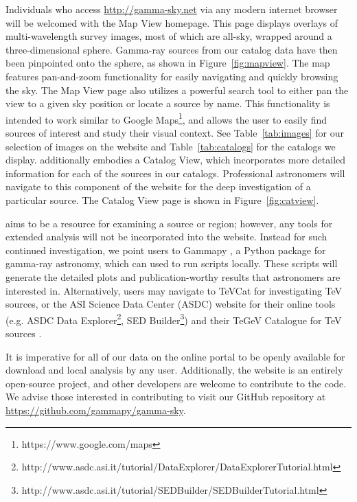 Individuals who access \url{http://gamma-sky.net} via any modern internet browser will be welcomed with the Map View homepage. This page displays overlays of multi-wavelength survey images, most of which are all-sky, wrapped around a three-dimensional sphere. Gamma-ray sources from our catalog data have then been pinpointed onto the sphere, as shown in Figure~\ref{fig:mapview}. The map features pan-and-zoom functionality for easily navigating and quickly browsing the sky. The Map View page also utilizes a powerful search tool to either pan the view to a given sky position or locate a source by name. This functionality is intended to work similar to Google Maps\footnote[1]{https://www.google.com/maps}, and allows the user to easily find sources of interest and study their visual context. See Table~\ref{tab:images} for our selection of images on the website and Table~\ref{tab:catalogs} for the catalogs we display. \gammasky additionally embodies a Catalog View, which incorporates more detailed information for each of the sources in our catalogs. Professional astronomers will navigate to this component of the website for the deep investigation of a particular source. The Catalog View page is shown in Figure~\ref{fig:catview}.





\gammasky aims to be a resource for examining a source or region; however, any tools for extended analysis will not be incorporated into the website. Instead for such continued investigation, we point users to Gammapy \cite{gammapy}, a Python package for gamma-ray astronomy, which can used to run scripts locally. These scripts will generate the detailed plots and publication-worthy results that astronomers are interested in. Alternatively, users may navigate to TeVCat \cite{tevcat} for investigating TeV sources, or the ASI Science Data Center (ASDC) website for their online tools (e.g. ASDC Data Explorer\footnote[2]{http://www.asdc.asi.it/tutorial/DataExplorer/DataExplorerTutorial.html}, SED Builder\footnote[3]{http://www.asdc.asi.it/tutorial/SEDBuilder/SEDBuilderTutorial.html}) and their TeGeV Catalogue for TeV sources \cite{tgevcat}.


It is imperative for all of our data on the online portal to be openly available for download and local analysis by any user. Additionally, the website is an entirely open-source project, and other developers are welcome to contribute to the code. We advise those interested in contributing to visit our GitHub repository at \url{https://github.com/gammapy/gamma-sky}.
